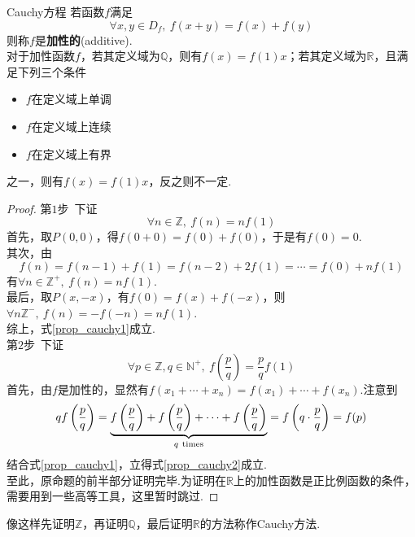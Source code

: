 \documentclass[lang=cn, zihao=5]{elegantbook}
\newcommand{\ssb}[1]{\left( #1 \right)}
\newcommand{\R}{\mathbb{R}}
\begin{document}
\begin{proposition}{Cauchy方程}
	若函数$f$满足$$\forall x,y \in D_f,~f(x+y)=f(x)+f(y)$$
	则称$f$是\textbf{加性的}(additive). \\
	对于加性函数$f$，若其定义域为$\mathbb{Q}$，则有$f(x)=f(1)x$；若其定义域为$\R$，且满足下列三个条件
	\begin{itemize}
		\item $f$在定义域上单调
		\item $f$在定义域上连续
		\item $f$在定义域上有界
	\end{itemize}
	之一，则有$f(x)=f(1)x$，反之则不一定.
\end{proposition}
\begin{proof}
	第$1$步~下证
	\begin{equation}
		\forall n \in \mathbb{Z},~ f(n)=nf(1) \label{prop_cauchy1}
	\end{equation}
	首先，取$P(0,0)$，得$f(0+0)=f(0)+f(0)$，于是有$f(0)=0$. \\
	其次，由$$f(n)=f(n-1)+f(1)=f(n-2)+2f(1)=\cdots =f(0)+nf(1)$$
	有$\forall n \in \mathbb{Z}^+,~ f(n)=nf(1)$. \\
	最后，取$P(x,-x)$，有$f(0)=f(x)+f(-x)$，则$\forall n \mathbb{Z}^-,~f(n)=-f(-n)=nf(1)$. \\
	综上，式\ref{prop_cauchy1}成立. \\
	第$2$步~下证
	\begin{equation}
		\forall p \in \mathbb{Z},q \in \mathbb{N}^+,~ f\ssb{\frac{p}{q}}=\frac{p}{q} f(1) \label{prop_cauchy2}
	\end{equation}
	首先，由$f$是加性的，显然有$f(x_1+ \cdots +x_n)=f(x_1) + \cdots + f(x_n)$.注意到$$qf\ssb{\frac{p}{q}} = \underbrace{f\ssb{\frac{p}{q}} + f\ssb{\frac{p}{q}} + \cdots + f\ssb{\frac{p}{q}}}_{q~ \rm times} = f\ssb{q \cdot \frac{p}{q}} = f(p)$$
	结合式\ref{prop_cauchy1}，立得式\ref{prop_cauchy2}成立. \\
	至此，原命题的前半部分证明完毕.为证明在$\R$上的加性函数是正比例函数的条件，需要用到一些高等工具，这里暂时跳过.
\end{proof}
\begin{remark}
	像这样先证明$\mathbb{Z}$，再证明$\mathbb{Q}$，最后证明$\R$的方法称作Cauchy方法.
\end{remark}
\end{document}
